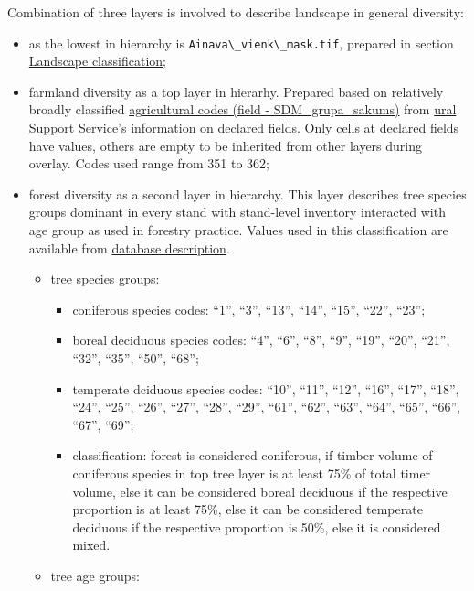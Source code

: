 \documentclass[
]{book}
\newcommand{\passthrough}[1]{#1}
\begin{document}
Combination of three layers is involved to describe landscape in general diversity:

\begin{itemize}
\item
  as the lowest in hierarchy is \passthrough{\lstinline!Ainava\_vienk\_mask.tif!}, prepared in section
  \hyperref[Ch05.03]{Landscape classification};
\item
  farmland diversity as a top layer in hierarhy. Prepared based on relatively
  broadly classified \href{https://github.com/aavotins/HiQBioDiv_EGVs/blob/main/Data/Geodata/2024/LAD/KulturuKodi_2024.xlsx}{agricultural codes (field - SDM\_grupa\_sakums)} from \hyperref[Ch04.02]{ural Support Service's information on declared fields}. Only cells
  at declared fields have values, others are empty to be inherited from other layers during overlay. Codes used range from 351 to 362;
\item
  forest diversity as a second layer in hierarchy. This layer describes tree
  species groups dominant in every stand with stand-level inventory interacted with
  age group as used in forestry practice. Values used in this classification are
  available from \href{https://www.vmd.gov.lv/lv/meza-valsts-registra-meza-inventarizacijas-failu-struktura}{database description}.

  \begin{itemize}
  \item
    tree species groups:

    \begin{itemize}
    \item
      coniferous species codes: ``1'', ``3'', ``13'', ``14'', ``15'', ``22'', ``23'';
    \item
      boreal deciduous species codes: ``4'', ``6'', ``8'', ``9'', ``19'', ``20'', ``21'',
      ``32'', ``35'', ``50'', ``68'';
    \item
      temperate dciduous species codes: ``10'', ``11'', ``12'', ``16'', ``17'', ``18'',
      ``24'', ``25'', ``26'', ``27'', ``28'', ``29'', ``61'', ``62'', ``63'', ``64'', ``65'', ``66'',
      ``67'', ``69'';
    \item
      classification: forest is considered coniferous, if timber volume of coniferous species in top tree layer is at least 75\% of total timer volume, else it can be considered boreal deciduous if the respective proportion is at least 75\%, else it can be considered temperate deciduous if the respective proportion is 50\%, else it is considered mixed.
    \end{itemize}
  \item
    tree age groups:


\end{itemize}
\end{itemize}
\end{document}
